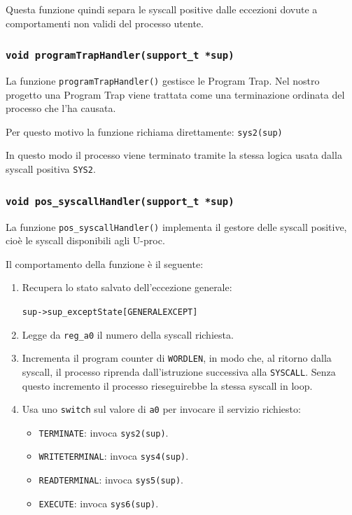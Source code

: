 \documentclass[a4paper,12pt]{article}
\begin{document}
\begin{enumerate}
Questa funzione quindi separa le syscall positive dalle eccezioni dovute a comportamenti non validi del processo utente.

\vspace{0.3cm}
\subsubsection{\texttt{void programTrapHandler(support\_t *sup)}}

La funzione \texttt{programTrapHandler()} gestisce le Program Trap. Nel nostro progetto una Program Trap viene trattata come una terminazione ordinata del processo che l'ha causata.

Per questo motivo la funzione richiama direttamente: \texttt{sys2(sup)}


In questo modo il processo viene terminato tramite la stessa logica usata dalla syscall positiva \texttt{SYS2}.

\vspace{0.3cm}
\subsubsection{\texttt{void pos\_syscallHandler(support\_t *sup)}}

La funzione \texttt{pos\_syscallHandler()} implementa il gestore delle syscall positive, cioè le syscall disponibili agli U-proc.

Il comportamento della funzione è il seguente:

\begin{enumerate}
    \item Recupera lo stato salvato dell'eccezione generale: 
    
    \texttt{sup->sup\_exceptState[GENERALEXCEPT]}

    \item Legge da \texttt{reg\_a0} il numero della syscall richiesta.

    \item Incrementa il program counter di \texttt{WORDLEN}, in modo che, al ritorno dalla syscall, il processo riprenda dall'istruzione successiva alla \texttt{SYSCALL}. Senza questo incremento il processo rieseguirebbe la stessa syscall in loop.

    \item Usa uno \texttt{switch} sul valore di \texttt{a0} per invocare il servizio richiesto:
    \begin{itemize}
        \item \texttt{TERMINATE}: invoca \texttt{sys2(sup)}.
        \item \texttt{WRITETERMINAL}: invoca \texttt{sys4(sup)}.
        \item \texttt{READTERMINAL}: invoca \texttt{sys5(sup)}.
        \item \texttt{EXECUTE}: invoca \texttt{sys6(sup)}.
    \end{itemize}


\end{enumerate}
\end{enumerate}
\end{document}
